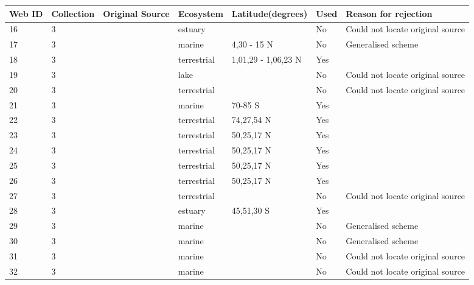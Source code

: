 \documentclass[12pt]{article}
\begin{document}
\begin{landscape}
    \begin{table}[h!]
    \centering
    {\footnotesize
      \begin{tabular}{p{2.8cm}p{1.3cm}p{3cm}p{2.2cm}p{2.5cm}lp{8.2cm}}
        \hline
        Web ID & Collection & Original Source & Ecosystem & Latitude(degrees) & Used  & Reason for rejection  \\
        \hline
        16    & 3 & \cite{Copeland1974}    & estuary &       & No    & Could not locate original source \\
        17    & 3 & \cite{Hiatt1960}  & marine & 4,30 - 15 N & No    & Generalised scheme \\
        18    & 3 & \cite{Niering1963a}  & terrestrial & 1,01,29 - 1,06,23 N & Yes   &       \\
        19    & 3 & \cite{Brooks1963}    & lake &       & No    & Could not locate original source \\
        20    & 3 & \cite{Knox1970}  & terrestrial &       & No    & Could not locate original source \\
        21    & 3 & \cite{Patten1979}  & marine & 70-85 S & Yes   &       \\
        22    & 3 & \cite{Summerhayes1923}  & terrestrial & 74,27,54 N & Yes   &       \\
        23    & 3 & \cite{Bird1930}  & terrestrial & 50,25,17 N & Yes   &       \\
        24    & 3 & \cite{Bird1930}  & terrestrial & 50,25,17 N & Yes   &       \\
        25    & 3 & \cite{Bird1930}  & terrestrial & 50,25,17 N & Yes   &       \\
        26    & 3 & \cite{Bird1930}  & terrestrial & 50,25,17 N & Yes   &       \\
        27    & 3 & \cite{Varley1970}  & terrestrial &       & No    & Could not locate original source \\
        28    & 3 & \cite{Paviour-Smith1956}  & estuary & 45,51,30 S & Yes   &       \\
        29    & 3 & \cite{Dunbar1953}  & marine &       & No    & Generalised scheme \\
        30    & 3 & \cite{Mackintosh1964}  & marine &       & No    & Generalised scheme \\
        31    & 3 & \cite{Petipa1970}  & marine &       & No    & Could not locate original source \\
        32    & 3 & \cite{Petipa1970}  & marine &       & No    & Could not locate original source \\

\end{tabular}}
\end{table}
\end{landscape}
\end{document}
